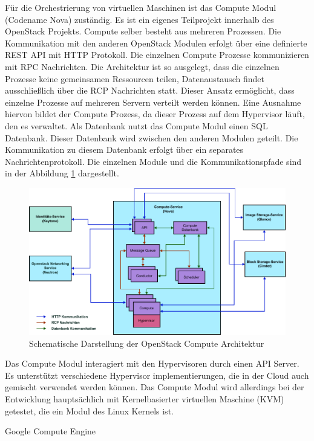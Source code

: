 Für die Orchestrierung von virtuellen Maschinen ist das Compute Modul (Codename Nova) zuständig. Es ist ein eigenes Teilprojekt innerhalb des OpenStack Projekts. Compute selber besteht aus mehreren Prozessen. Die Kommunikation mit den anderen OpenStack Modulen erfolgt über eine definierte REST API mit HTTP Protokoll. Die einzelnen Compute Prozesse kommunizieren mit RPC Nachrichten. Die Architektur ist so ausgelegt, dass die einzelnen Prozesse keine gemeinsamen Ressourcen teilen, Datenaustausch findet ausschließlich über die RCP Nachrichten statt. Dieser Ansatz ermöglicht, dass einzelne Prozesse auf mehreren Servern verteilt werden können. Eine Ausnahme hiervon bildet der Compute Prozess, da dieser Prozess auf dem Hypervisor läuft, den es verwaltet. Als Datenbank nutzt das Compute Modul einen SQL Datenbank. Dieser Datenbank wird zwischen den anderen Modulen geteilt. Die Kommunikation zu diesem Datenbank erfolgt über ein separates Nachrichtenprotokoll. Die einzelnen Module und die Kommunikationspfade sind in der Abbildung \ref{compute_arch} dargestellt. 

\begin{figure}
	\centering
	\includegraphics[width=\textwidth]{./content/graphics/compute_arch.pdf}
	\caption{Schematische Darstellung der OpenStack Compute Architektur}
	\label{compute_arch}
\end{figure}

Das Compute Modul interagiert mit den Hypervisoren durch einen API Server. Es unterstützt verschiedene Hypervisor implementierungen, die in der Cloud auch gemischt verwendet werden können. Das Compute Modul wird allerdings bei der Entwicklung hauptsächlich mit Kernelbasierter virtuellen Maschine (KVM) getestet, die ein Modul des Linux Kernels ist. 

Google Compute Engine

